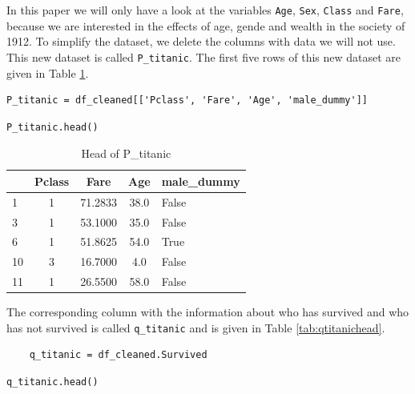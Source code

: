 \documentclass[11pt]{article}
\begin{document}
In this paper we will only have a look at the variables \texttt{Age}, \texttt{Sex}, \texttt{Class} and \texttt{Fare}, because we are interested in the effects of age, gende and wealth in the society of 1912. To simplify the dataset, we delete the columns with data we will not use. This new dataset is called \texttt{P\_titanic}. The first five rows of this new dataset are given in Table \ref{tab:ptitanichead}.
\begin{verbatim}
P_titanic = df_cleaned[['Pclass', 'Fare', 'Age', 'male_dummy']]
\end{verbatim}

\begin{verbatim}
P_titanic.head()
\end{verbatim}


\begin{table}
\small
\begin{center}
\caption{\label{tab:ptitanichead}Head of P_titanic}
\begin{tabular}{|l|c|c|c|l|}
\toprule
\hline
{} &  Pclass &     Fare &   Age &  male\_dummy \\
\midrule
\hline
1  &       1 &  71.2833 &  38.0 &       False \\
3  &       1 &  53.1000 &  35.0 &       False \\
6  &       1 &  51.8625 &  54.0 &        True \\
10 &       3 &  16.7000 &   4.0 &       False \\
11 &       1 &  26.5500 &  58.0 &       False \\
\hline
\bottomrule
\end{tabular}
\end{center}
\end{table}



The corresponding column with the information about who has survived and who has not survived is called \texttt{q\_titanic} and is given in Table \ref{tab:qtitanichead}. 


\begin{verbatim}
    q_titanic = df_cleaned.Survived
\end{verbatim}

\begin{verbatim}
q_titanic.head()
\end{verbatim}
\end{document}
